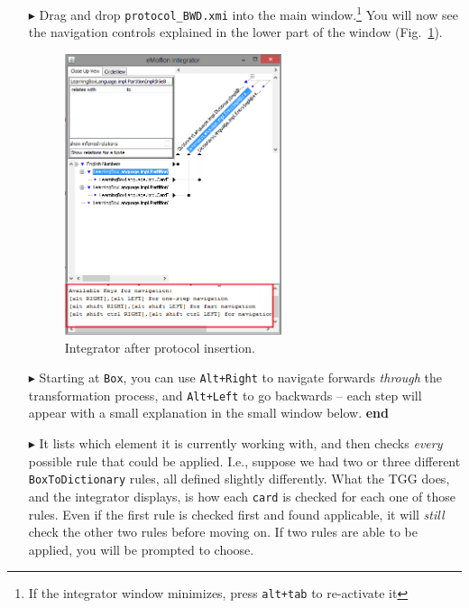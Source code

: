 \begin{itemize}
\item[$\blacktriangleright$] Drag and drop \texttt{protocol\_BWD.xmi} into the main window.\footnote{If the integrator window minimizes, press \texttt{alt+tab}
to re-activate it} You will now see the navigation controls explained in the lower part of the window (Fig.~\ref{fig:integrator_after_protocol}).

\begin{figure}[h!]
\begin{center}
  \includegraphics[width=0.6\textwidth]{integrator_after_protocol_insertion.png}
  \caption{Integrator after protocol insertion.}
  \label{fig:integrator_after_protocol}
\end{center}
\end{figure} 

\item[$\blacktriangleright$]  Starting at \texttt{Box}, you can use \texttt{Alt+Right} to navigate forwards \emph{through} the transformation process, and
\texttt{Alt+Left} to go backwards -- each step will appear with a small explanation in the small window below. {\bf end}

\item[$\blacktriangleright$] It lists which element it is currently working with, and then checks \emph{every} possible rule that could be applied. I.e.,
suppose we had two or three different \texttt{BoxToDictionary} rules, all defined slightly differently. What the TGG does, and the integrator displays, is how
each \texttt{card} is checked for each one of those rules. Even if the first rule is checked first and found applicable, it will \emph{still} check the other
two rules before moving on. If two rules are able to be applied, you will be prompted to choose.


\end{itemize}
